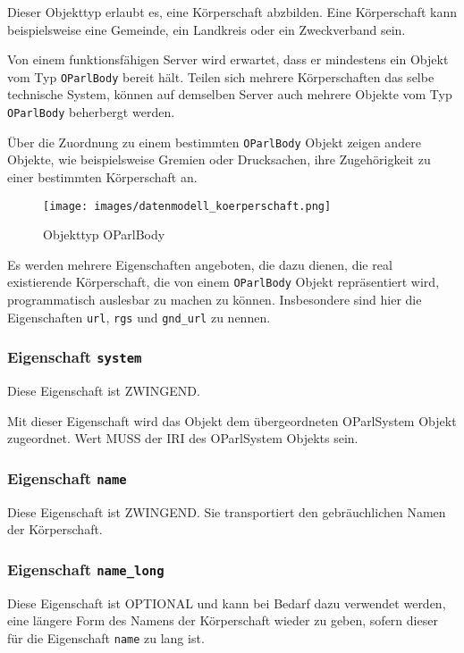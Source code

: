 \documentclass[,a4paper]{article}
\makeatletter
\def\maxwidth{\ifdim\Gin@nat@width>\linewidth\linewidth
\else\Gin@nat@width\fi}
\let\Oldincludegraphics\includegraphics
\renewcommand{\includegraphics}[1]{\Oldincludegraphics[width=\maxwidth]{#1}}
\makeatother
\begin{document}
Dieser Objekttyp erlaubt es, eine Körperschaft abzbilden. Eine
Körperschaft kann beispielsweise eine Gemeinde, ein Landkreis oder ein
Zweckverband sein.

Von einem funktionsfähigen Server wird erwartet, dass er mindestens ein
Objekt vom Typ \texttt{OParlBody} bereit hält. Teilen sich mehrere
Körperschaften das selbe technische System, können auf demselben Server
auch mehrere Objekte vom Typ \texttt{OParlBody} beherbergt werden.

Über die Zuordnung zu einem bestimmten \texttt{OParlBody} Objekt zeigen
andere Objekte, wie beispielsweise Gremien oder Drucksachen, ihre
Zugehörigkeit zu einer bestimmten Körperschaft an.

\begin{figure}[htbp]
\centering
\texttt{[image: images/datenmodell\_koerperschaft.png]}
\caption{Objekttyp OParlBody}
\end{figure}

Es werden mehrere Eigenschaften angeboten, die dazu dienen, die real
existierende Körperschaft, die von einem \texttt{OParlBody} Objekt
repräsentiert wird, programmatisch auslesbar zu machen zu können.
Insbesondere sind hier die Eigenschaften \texttt{url}, \texttt{rgs} und
\texttt{gnd\_url} zu nennen.

\subsubsection{Eigenschaft \texttt{system}}

Diese Eigenschaft ist ZWINGEND.

Mit dieser Eigenschaft wird das Objekt dem übergeordneten OParlSystem
Objekt zugeordnet. Wert MUSS der IRI des OParlSystem Objekts sein.

\subsubsection{Eigenschaft \texttt{name}}

Diese Eigenschaft ist ZWINGEND. Sie transportiert den gebräuchlichen
Namen der Körperschaft.

\subsubsection{Eigenschaft \texttt{name\_long}}

Diese Eigenschaft ist OPTIONAL und kann bei Bedarf dazu verwendet
werden, eine längere Form des Namens der Körperschaft wieder zu geben,
sofern dieser für die Eigenschaft \texttt{name} zu lang ist.
\end{document}
